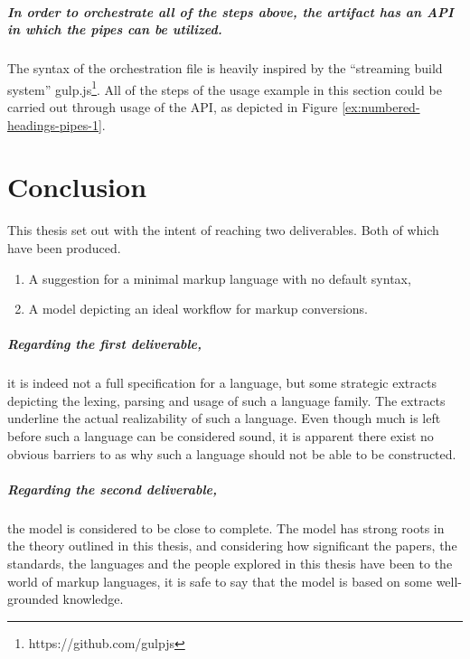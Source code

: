 \documentclass{scrreprt}
\begin{document}
\paragraph{In order to orchestrate all of the steps above, the artifact has an API in which the pipes can be utilized.} The syntax of the orchestration file is heavily inspired by the ``streaming build system'' gulp.js\footnote{https://github.com/gulpjs}. All of the steps of the usage example in this section could be carried out through usage of the API, as depicted in Figure \ref{ex:numbered-headings-pipes-1}.

























%
%
%
%
%
%

\chapter{Conclusion}
This thesis set out with the intent of reaching two deliverables. Both of which have been produced.

\begin{enumerate}
\item A suggestion for a minimal markup language with no default syntax,
\item A model depicting an ideal workflow for markup conversions.
\end{enumerate}

\paragraph{Regarding the first deliverable,} it is indeed not a full specification for a language, but some strategic extracts depicting the lexing, parsing and usage of such a language family. The extracts underline the actual realizability of such a language. Even though much is left before such a language can be considered sound, it is apparent there exist no obvious barriers to as why such a language should not be able to be constructed.

\paragraph{Regarding the second deliverable,} the model is considered to be close to complete. The model has strong roots in the theory outlined in this thesis, and considering how significant the papers, the standards, the languages and the people explored in this thesis have been to the world of markup languages, it is safe to say that the model is based on some well-grounded knowledge.
\end{document}
